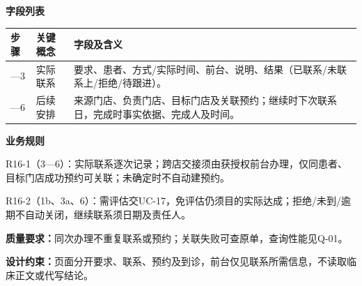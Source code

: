 \documentclass[UTF8,a4paper,zihao=-4,fontset=none]{ctexart}
\begin{document}
\noindent\textbf{字段列表}\par
{\setlength{\tabcolsep}{3pt}\renewcommand{\arraystretch}{1.04}
\noindent\begin{tabular}{@{}>{\raggedright\arraybackslash}p{1.2cm}>{\raggedright\arraybackslash}p{2.2cm}>{\raggedright\arraybackslash}p{12.3cm}@{}}
\toprule
步骤 & 关键概念 & 字段及含义 \\ \midrule
1—3 & 实际联系 & 要求、患者、方式/实际时间、前台、说明、结果（已联系/未联系上/拒绝/待跟进）。 \\
4—6 & 后续安排 & 来源门店、负责门店、目标门店及关联预约；继续时下次联系日，完成时事实依据、完成人及时间。 \\
\bottomrule
\end{tabular}\par}
\smallskip
\noindent\textbf{业务规则}\par
\noindent R16-1（3—6）：实际联系逐次记录；跨店交接须由获授权前台办理，仅同患者、目标门店成功预约可关联；未确定时不自动建预约。\par
\noindent R16-2（1b、3a、6）：需评估交UC-17，免评估仍须目的实际达成；拒绝/未到/逾期不自动关闭，继续联系须日期及责任人。\par
\smallskip
\noindent\textbf{质量要求：}同次办理不重复联系或预约；关联失败可查原单，查询性能见Q-01。\par
\noindent\textbf{设计约束：}页面分开要求、联系、预约及到诊，前台仅见联系所需信息，不读取临床正文或代写结论。\par
\endgroup
\clearpage
\end{document}
